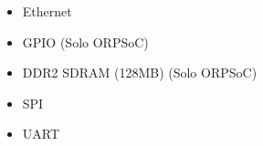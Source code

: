 				\begin{itemize}
				  \item Ethernet
				  \item GPIO (Solo ORPSoC)
				  \item DDR2 SDRAM (128MB) (Solo ORPSoC)
				  \item SPI
				  \item UART				
				\end{itemize}
			
%				
%			
